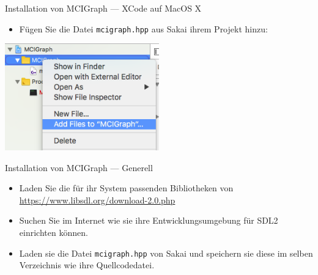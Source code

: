 \documentclass[presentation]{beamer}
\begin{document}
\begin{frame}[label={sec:orgbf187a0},fragile]{Installation von MCIGraph --- XCode auf MacOS X}
 \begin{itemize}
\item Fügen Sie die Datei {\color{solarizedYellow}\texttt{mcigraph.hpp} }aus Sakai ihrem Projekt hinzu:
\end{itemize}
\begin{center}\begin{center}
\includegraphics[width=0.5\textwidth]{xcode_images/addfiles.png}
\end{center}\end{center}
\end{frame}
\begin{frame}[label={sec:org86d3c92},fragile]{Installation von MCIGraph --- Generell}
 \begin{itemize}
\item Laden Sie die für ihr System passenden Bibliotheken von
\url{https://www.libsdl.org/download-2.0.php}
\item Suchen Sie im Internet wie sie ihre Entwicklungsumgebung für SDL2
einrichten können.
\item Laden sie die Datei {\color{solarizedYellow}\texttt{mcigraph.hpp} }von Sakai und speichern sie diese
im selben Verzeichnis wie ihre Quellcodedatei.
\end{itemize}
\end{frame}
\end{document}
